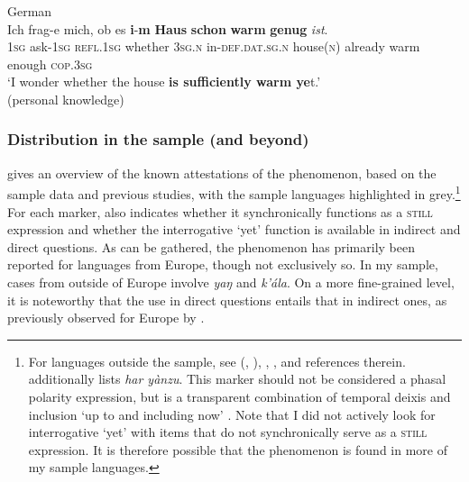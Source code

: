 \begin{exe}
	\ex German\label{exInterrogativeYetGerman}\\
	\gll Ich frag-e mich, ob es \textbf{i}-\textbf{m} \textbf{Haus} \textbf{schon} \textbf{warm} \textbf{genug} \textit{ist}.\\
	1\textsc{sg} ask-1\textsc{sg} \textsc{refl}.1\textsc{sg} whether 3\textsc{sg}.\textsc{n} in-\textsc{def}.\textsc{dat}.\textsc{sg}.\textsc{n} house(\textsc{n}) already warm enough \textsc{cop}.3\textsc{sg}\\
	\glt \lq I wonder whether the house \textbf{is sufficiently warm ye}t.\rq
	\\(personal knowledge)
\end{exe}

\subsubsection{Distribution in the sample (and beyond)}
 gives an overview of the known attestations of the phenomenon, based on the sample data and previous studies, with the sample languages highlighted in grey.\footnote{For languages outside the sample, see \citeauthor{vanderAuwera1993} (\citeyear{vanderAuwera1993}, \citeyear{vanderAuwera1998}), \textcite[193–194]{vanBaar1997}, \textcite{Vaelikangas1982}, and references therein. \Textcite[193]{vanBaar1997} additionally lists  \textit{har yànzu}. This marker should not be considered a phasal polarity expression, but is a transparent combination of temporal deixis and inclusion \lq up to and including now' \parencite{Ziegelmeyer2021}. Note that I did not actively look for interrogative \lq yet\rq{ }with items that do not synchronically serve as a \textsc{still} expression. It is therefore possible that the phenomenon is found in more of my sample languages.} For each marker,  also indicates whether it synchronically functions as a \textsc{still} expression and whether the interrogative \lq yet\rq{ }function is available in indirect and direct questions. As can be gathered, the phenomenon has primarily been reported for languages from Europe, though not exclusively so. In my sample, cases from outside of Europe involve  \textit{yaŋ} and  \textit{k'ála}. On a more fine-grained level, it is noteworthy that the use in direct questions entails that in indirect ones, as previously observed for Europe by \textcite{vanderAuwera1998}.\largerpage[2]

